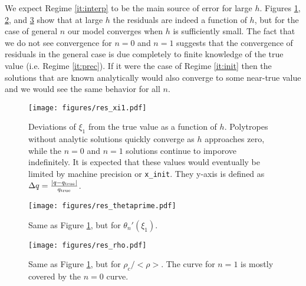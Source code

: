 \documentclass[twocolumn]{aastex631}
\begin{document}
We expect Regime \ref{it:interp} to be the main source of error for
large $h$. Figures \ref{fig:res_xi1}, \ref{fig:res_thetaprime},
and \ref{fig:res_rho} show that at large $h$ the residuals
are indeed a function of $h$, but for the case of general $n$ our
model converges when $h$ is sufficiently small. The fact that we
do not see convergence for $n=0$ and $n=1$ suggests that the convergence
of residuals in the general case is due completely to finite knowledge
of the true value (i.e. Regime \ref{it:prec}). If it were the case of
Regime \ref{it:init} then the solutions that are known analytically
would also converge to some near-true value and we would see the same behavior
for all $n$.

\begin{figure}[h]
    \begin{centering}
        \texttt{[image: figures/res\_xi1.pdf]}
        \caption{Deviations of $\xi_1$ from the true value as a
        function of $h$. Polytropes without analytic solutions
        quickly converge as $h$ approaches zero, while the
        $n=0$ and $n=1$ solutions continue to imporove indefinitely.
        It is expected that these values would eventually
        be limited by machine precision or \texttt{x\_init}.
        They y-axis is defined as
        $\Delta q = \frac{|q-q_{\rm true}|}{q_{\rm true}}$.
        }
        \label{fig:res_xi1}
    \end{centering}
\end{figure}

\begin{figure}[h]
    \begin{centering}
        \texttt{[image: figures/res\_thetaprime.pdf]}
        \caption{Same as Figure \ref{fig:res_xi1}, but for
        $\theta_n'(\xi_1)$.}
        \label{fig:res_thetaprime}
    \end{centering}
\end{figure}

\begin{figure}[h]
    \begin{centering}
        \texttt{[image: figures/res\_rho.pdf]}
        \caption{Same as Figure \ref{fig:res_xi1}, but for
        $\rho_c/<\rho>$. The curve for $n=1$ is mostly covered
        by the $n=0$ curve.}
        \label{fig:res_rho}
    \end{centering}
\end{figure}
\end{document}
